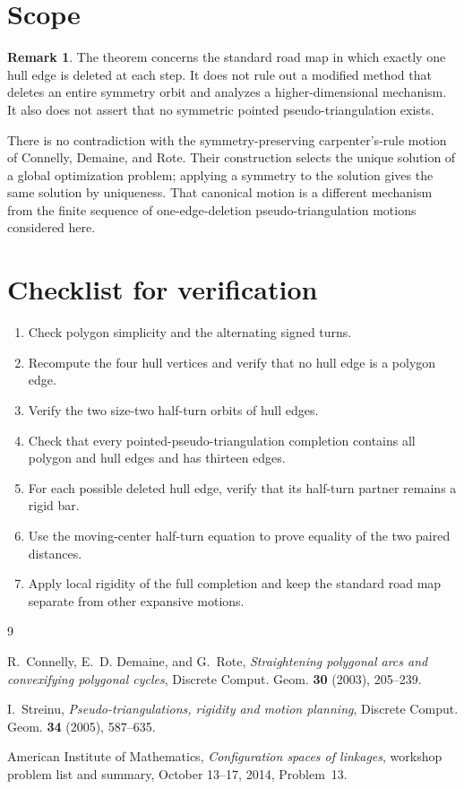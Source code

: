 \documentclass[10pt,reqno]{amsart}
\theoremstyle{definition}
\newtheorem{remark}[theorem]{Remark}
\begin{document}
\section{Scope}

\begin{remark}\label{rem:scope}
The theorem concerns the standard road map in which exactly one hull edge is
deleted at each step.  It does not rule out a modified method that deletes an
entire symmetry orbit and analyzes a higher-dimensional mechanism.  It also
does not assert that no symmetric pointed pseudo-triangulation exists.
\end{remark}

There is no contradiction with the symmetry-preserving carpenter's-rule
motion of Connelly, Demaine, and Rote.  Their construction selects the unique
solution of a global optimization problem; applying a symmetry to the
solution gives the same solution by uniqueness.  That canonical motion is a
different mechanism from the finite sequence of one-edge-deletion
pseudo-triangulation motions considered here.

\appendix

\section{Checklist for verification}

\begin{enumerate}
  \item Check polygon simplicity and the alternating signed turns.
  \item Recompute the four hull vertices and verify that no hull edge is a
  polygon edge.
  \item Verify the two size-two half-turn orbits of hull edges.
  \item Check that every pointed-pseudo-triangulation completion contains all
  polygon and hull edges and has thirteen edges.
  \item For each possible deleted hull edge, verify that its half-turn partner
  remains a rigid bar.
  \item Use the moving-center half-turn equation to prove equality of the two
  paired distances.
  \item Apply local rigidity of the full completion and keep the standard
  road map separate from other expansive motions.
\end{enumerate}

\begin{thebibliography}{9}

R.~Connelly, E.~D. Demaine, and G.~Rote,
\emph{Straightening polygonal arcs and convexifying polygonal cycles},
Discrete Comput. Geom. \textbf{30} (2003), 205--239.

I.~Streinu,
\emph{Pseudo-triangulations, rigidity and motion planning},
Discrete Comput. Geom. \textbf{34} (2005), 587--635.

American Institute of Mathematics,
\emph{Configuration spaces of linkages},
workshop problem list and summary, October 13--17, 2014, Problem~13.

\end{thebibliography}
\end{document}
